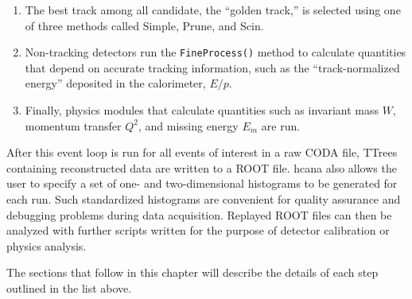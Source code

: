 \begin{enumerate}
    \item The best track among all candidate, the ``golden track,'' is selected
        using one of three methods called Simple, Prune, and Scin.

    \item Non-tracking detectors run the \texttt{FineProcess()} method to
        calculate quantities that depend on accurate tracking information,
        such as the ``track-normalized energy'' deposited in the calorimeter,
        $E/p$.

    \item Finally, physics modules that calculate quantities such as invariant
        mass $W$, momentum transfer $Q^2$, and missing energy $E_m$ are run.

\end{enumerate}




After this event loop is run for all events of interest in a raw CODA file,
TTrees containing reconstructed data are written to a ROOT file.
hcana also allows the user to specify a set of one- and
two-dimensional histograms to be generated for each run.
Such standardized histograms are convenient for quality assurance and debugging
problems during data acquisition.
Replayed ROOT files can then be analyzed with further scripts written for the
purpose of detector calibration or physics analysis.


The sections that follow in this chapter will describe the details of each step
outlined in the list above.
